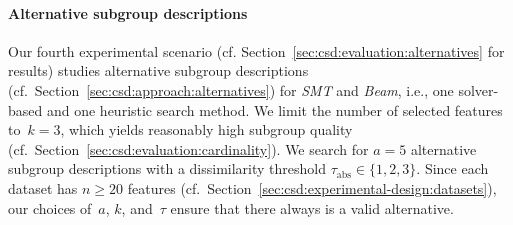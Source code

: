 \documentclass{article}
\theoremstyle{definition}
\begin{document}
\paragraph{Alternative subgroup descriptions}

Our fourth experimental scenario (cf. Section~\ref{sec:csd:evaluation:alternatives} for results) studies alternative subgroup descriptions (cf.~Section~\ref{sec:csd:approach:alternatives}) for \emph{SMT} and \emph{Beam}, i.e., one solver-based and one heuristic search method.
We limit the number of selected features to~$k=3$, which yields reasonably high subgroup quality (cf.~Section~\ref{sec:csd:evaluation:cardinality}).
We search for $a=5$ alternative subgroup descriptions with a dissimilarity threshold $\tau_{\text{abs}} \in \{1, 2, 3\}$.
Since each dataset has $n \geq 20$ features (cf.~Section~\ref{sec:csd:experimental-design:datasets}), our choices of~$a$, $k$, and~$\tau$ ensure that there always is a valid alternative.
\end{document}

